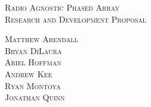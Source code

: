 \begin{titlepage}
\vspace*{1.5cm}
\textsc{\Huge Radio Agnostic Phased Array}\\[.5cm]
\textsc{\Large Research and Development Proposal}\\[13.5cm]



\begin{center} 
\hfill \textsc{\large Matthew Arendall}\\[0.2cm]
\hfill \textsc{\large Bryan DiLaura} \\[0.2cm]
\hfill \textsc{\large Ariel Hoffman} \\[0.2cm]
\hfill \textsc{\large Andrew Kee} \\[0.2cm]
\hfill \textsc{\large Ryan Montoya} \\[0.2cm]
\hfill \textsc{\large Jonathan Quinn} \\[0.2cm]

\end{center}
\end{titlepage}